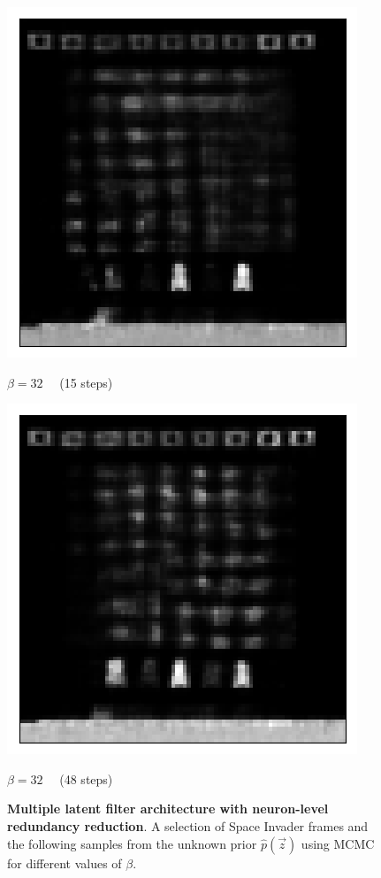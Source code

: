 \begin{figure}[h!]
\begin{multicols}{4}
    \includegraphics[scale=0.4]{figures/results/indiscriminate_decoupling/beta_32_posterior_sample_16.png}
    \caption{$\beta=32\quad$ (15 steps)}
    \includegraphics[scale=0.4]{figures/results/indiscriminate_decoupling/beta_32_posterior_sample_49.png}
    \caption{$\beta=32\quad$ (48 steps)}
\end{multicols}

\caption{\textbf{Multiple latent filter architecture with neuron-level redundancy reduction}. A selection of Space Invader frames and the following samples from the unknown prior $\hat{p}(\vec{z})$ using MCMC for different values of $\beta$.}
\label{fig:indiscriminate_decoupling_posterior_samples}
\end{figure}


